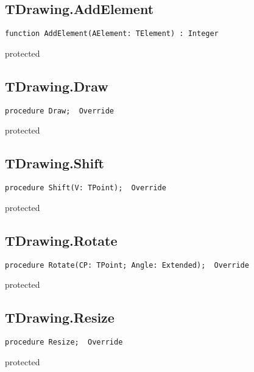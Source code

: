 \subsection{TDrawing.AddElement}
\label{hmi:drawncontrol:tdrawing:addelement}
\begin{FPCList}
\Declaration 

\begin{verbatim}
function AddElement(AElement: TElement) : Integer
\end{verbatim}
\Visibility
protected
\end{FPCList}
\subsection{TDrawing.Draw}
\label{hmi:drawncontrol:tdrawing:draw}
\begin{FPCList}
\Declaration 

\begin{verbatim}
procedure Draw;  Override
\end{verbatim}
\Visibility
protected
\end{FPCList}
\subsection{TDrawing.Shift}
\label{hmi:drawncontrol:tdrawing:shift}
\begin{FPCList}
\Declaration 

\begin{verbatim}
procedure Shift(V: TPoint);  Override
\end{verbatim}
\Visibility
protected
\end{FPCList}
\subsection{TDrawing.Rotate}
\label{hmi:drawncontrol:tdrawing:rotate}
\begin{FPCList}
\Declaration 

\begin{verbatim}
procedure Rotate(CP: TPoint; Angle: Extended);  Override
\end{verbatim}
\Visibility
protected
\end{FPCList}
\subsection{TDrawing.Resize}
\label{hmi:drawncontrol:tdrawing:resize}
\begin{FPCList}
\Declaration 

\begin{verbatim}
procedure Resize;  Override
\end{verbatim}
\Visibility
protected
\end{FPCList}

